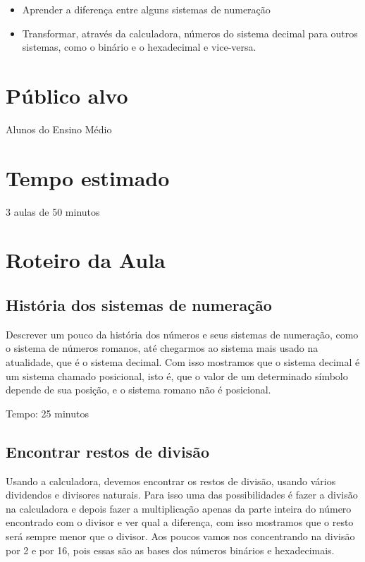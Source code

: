\documentclass[12pt, openright, a4paper, brazil, openany, oneside]{abntex2}
\begin{document}
\begin{itemize}
    \item Aprender a diferença entre alguns sistemas de numeração
    \item Transformar, através da calculadora, números do sistema decimal para outros  sistemas, como o binário e o hexadecimal e vice-versa.
\end{itemize}


\chapter{Público alvo}

Alunos do Ensino Médio

\vspace{1cm}

\chapter{Tempo estimado}

3 aulas de 50 minutos
\vspace{1cm}



\chapter{Roteiro da Aula}
\section{História dos sistemas de numeração}

Descrever um pouco da história dos números e seus sistemas de numeração, como o sistema de números romanos, até chegarmos ao sistema mais usado na atualidade, que é o sistema decimal. Com isso mostramos que o sistema decimal é um sistema chamado posicional, isto é, que o valor de um determinado símbolo depende de sua posição, e o sistema romano não é posicional.

Tempo: 25 minutos
\section{Encontrar restos de divisão}

Usando a calculadora, devemos encontrar os restos de divisão, usando vários dividendos e divisores naturais. Para isso uma das possibilidades é fazer a divisão na calculadora e depois fazer a multiplicação apenas da parte inteira do número encontrado com o divisor e ver qual a diferença, com isso mostramos que o resto será sempre menor que o divisor. Aos poucos vamos nos concentrando na divisão por 2 e por 16, pois essas são as bases dos números binários e hexadecimais.
\end{document}
